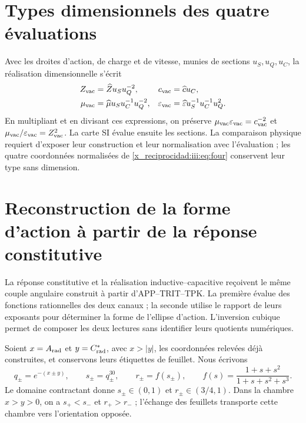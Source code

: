 \section{Types dimensionnels des quatre évaluations}

Avec les droites d’action, de charge et de vitesse, munies de sections
$u_S,u_Q,u_C$, la réalisation dimensionnelle s’écrit
\begin{align}
 Z_{\rm vac}&=\widehat Z u_Su_Q^{-2},&
 c_{\rm vac}&=\widehat c u_C,\\
 \mu_{\rm vac}&=\widehat\mu u_Su_C^{-1}u_Q^{-2},&
 \varepsilon_{\rm vac}&=\widehat\varepsilon u_S^{-1}u_C^{-1}u_Q^2.
 \label{x_reciprocidad:iii:eq:dimensions}
\end{align}
En multipliant et en divisant ces expressions, on préserve $\mu_{\rm vac}\varepsilon_{\rm vac}=c_{\rm vac}^{-2}$ et $\mu_{\rm vac}/\varepsilon_{\rm vac}=Z_{\rm vac}^2$. La carte SI évalue ensuite les sections. La comparaison physique requiert d'exposer leur construction et leur normalisation avec l'évaluation ; les quatre coordonnées normalisées de \eqref{x_reciprocidad:iii:eq:four} conservent leur type sans dimension.



\section{Reconstruction de la forme d’action à partir de la réponse constitutive}
\label{x_reciprocidad:iii:subsec:puente-forma-LC}

La réponse constitutive et la réalisation inductive--capacitive reçoivent
le même couple angulaire construit à partir d’APP--TRIT--TPK. La première évalue
des fonctions rationnelles des deux canaux ; la seconde utilise le rapport de
leurs exposants pour déterminer la forme de l’ellipse d’action.
L’inversion cubique permet de composer les deux lectures sans identifier leurs
quotients numériques.

Soient $x=A_{\rm rad}$ et $y=C^*_{\rm rad}$, avec $x>|y|$, les coordonnées
relevées déjà construites, et conservons leurs étiquettes de feuillet. Nous écrivons
\begin{equation}
 q_\pm=e^{-(x\pm y)},\qquad s_\pm=q_\pm^{30},\qquad
 r_\pm=f(s_\pm),\qquad
 f(s)=\frac{1+s+s^2}{1+s+s^2+s^3}.
 \label{x_reciprocidad:iii:eq:forma-canales}
\end{equation}
Le domaine contractant donne $s_\pm\in(0,1)$ et $r_\pm\in(3/4,1)$. Dans la chambre $x>y>0$, on a $s_+<s_-$ et $r_+>r_-$ ; l'échange des feuillets transporte cette chambre vers l'orientation opposée.

